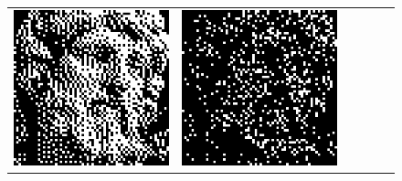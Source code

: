 \begin{figure}
\begin{tabular}{c c c c c c}
		\includegraphics[width=\tilewidth,interpolate=false]{media/chp2/associative_memory/binam/04_00_orig_scaled_crushed.png}&%
		\includegraphics[width=\tilewidth,interpolate=false]{media/chp2/associative_memory/binam/04_01_noise_scaled_crushed.png}&%

\end{tabular}
\end{figure}
